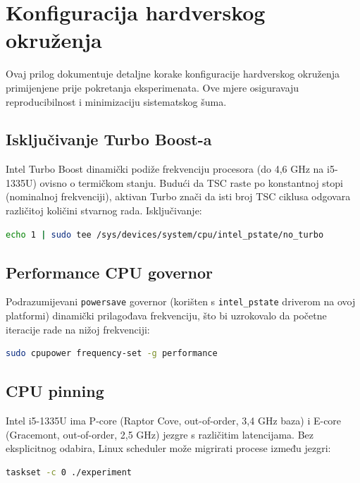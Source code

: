 \chapter{Konfiguracija hardverskog okruženja}
\label{app:hw_config}

Ovaj prilog dokumentuje detaljne korake konfiguracije hardverskog okruženja primijenjene prije pokretanja eksperimenata. Ove mjere osiguravaju reproducibilnost i minimizaciju sistematskog šuma.

\section{Isključivanje Turbo Boost-a}

Intel Turbo Boost dinamički podiže frekvenciju procesora (do 4{,}6 GHz na i5-1335U) ovisno o termičkom stanju. Budući da TSC raste po konstantnoj stopi (nominalnoj frekvenciji), aktivan Turbo znači da isti broj TSC ciklusa odgovara različitoj količini stvarnog rada. Isključivanje:

\begin{lstlisting}[language=bash, caption={Isključivanje Intel Turbo Boost-a}]
echo 1 | sudo tee /sys/devices/system/cpu/intel_pstate/no_turbo
\end{lstlisting}

\section{Performance CPU governor}

Podrazumijevani \texttt{powersave} governor (korišten s \texttt{intel\_pstate} driverom na ovoj platformi) dinamički prilagođava frekvenciju, što bi uzrokovalo da početne iteracije rade na nižoj frekvenciji:

\begin{lstlisting}[language=bash, caption={Postavljanje performance governor-a}]
sudo cpupower frequency-set -g performance
\end{lstlisting}

\section{CPU pinning}

Intel i5-1335U ima P-core (Raptor Cove, out-of-order, 3{,}4 GHz baza) i E-core (Gracemont, out-of-order, 2{,}5 GHz) jezgre s različitim latencijama. Bez eksplicitnog odabira, Linux scheduler može migrirati procese između jezgri:

\begin{lstlisting}[language=bash, caption={Pokretanje eksperimenta s fiksiranjem na P-core 0}]
taskset -c 0 ./experiment
\end{lstlisting}

